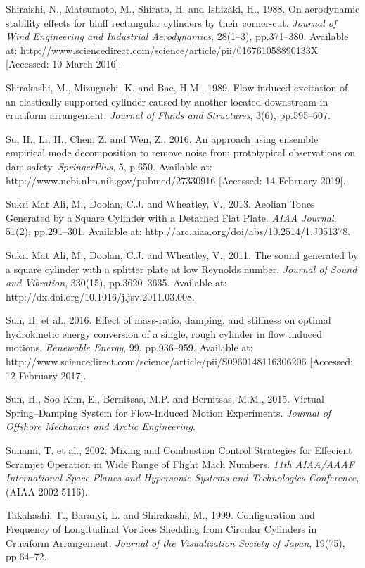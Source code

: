 \documentclass[]{article}
\begin{document}
Shiraishi, N., Matsumoto, M., Shirato, H. and Ishizaki, H., 1988. On
aerodynamic stability effects for bluff rectangular cylinders by their
corner-cut. \emph{Journal of Wind Engineering and Industrial
Aerodynamics}, 28(1--3), pp.371--380. Available at:
http://www.sciencedirect.com/science/article/pii/016761058890133X
{[}Accessed: 10 March 2016{]}.

Shirakashi, M., Mizuguchi, K. and Bae, H.M., 1989. Flow-induced
excitation of an elastically-supported cylinder caused by another
located downstream in cruciform arrangement. \emph{Journal of Fluids and
Structures}, 3(6), pp.595--607.

Su, H., Li, H., Chen, Z. and Wen, Z., 2016. An approach using ensemble
empirical mode decomposition to remove noise from prototypical
observations on dam safety. \emph{SpringerPlus}, 5, p.650. Available at:
http://www.ncbi.nlm.nih.gov/pubmed/27330916 {[}Accessed: 14 February
2019{]}.

Sukri Mat Ali, M., Doolan, C.J. and Wheatley, V., 2013. Aeolian Tones
Generated by a Square Cylinder with a Detached Flat Plate. \emph{AIAA
Journal}, 51(2), pp.291--301. Available at:
http://arc.aiaa.org/doi/abs/10.2514/1.J051378.

Sukri Mat Ali, M., Doolan, C.J. and Wheatley, V., 2011. The sound
generated by a square cylinder with a splitter plate at low Reynolds
number. \emph{Journal of Sound and Vibration}, 330(15), pp.3620--3635.
Available at: http://dx.doi.org/10.1016/j.jsv.2011.03.008.

Sun, H. et al., 2016. Effect of mass-ratio, damping, and stiffness on
optimal hydrokinetic energy conversion of a single, rough cylinder in
flow induced motions. \emph{Renewable Energy}, 99, pp.936--959.
Available at:
http://www.sciencedirect.com/science/article/pii/S0960148116306206
{[}Accessed: 12 February 2017{]}.

Sun, H., Soo Kim, E., Bernitsas, M.P. and Bernitsas, M.M., 2015. Virtual
Spring--Damping System for Flow-Induced Motion Experiments.
\emph{Journal of Offshore Mechanics and Arctic Engineering}.

Sunami, T. et al., 2002. Mixing and Combustion Control Strategies for
Effecient Scramjet Operation in Wide Range of Flight Mach Numbers.
\emph{11th AIAA/AAAF International Space Planes and Hypersonic Systems
and Technologies Conference}, (AIAA 2002-5116).

Takahashi, T., Baranyi, L. and Shirakashi, M., 1999. Configuration and
Frequency of Longitudinal Vortices Shedding from Circular Cylinders in
Cruciform Arrangement. \emph{Journal of the Visualization Society of
Japan}, 19(75), pp.64--72.
\end{document}
